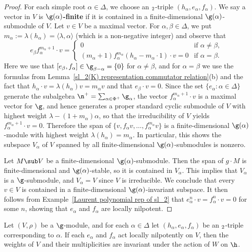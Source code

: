 \begin{proof}
For each simple root $\alpha\in\Delta$, we choose an $\sl_2$-triple $(h_\alpha,e_\alpha,f_\alpha)$. We say a vector in $V$ is \textbf{$\g(\alpha)$-finite} if it is contained in a finite-dimensional $\g(\alpha)$-submodule of $V$. Let $v\in V$ be a maximal vector. For $\alpha,\beta\in\Delta$, we put $m_\alpha:=\lambda(h_\alpha)=\langle\lambda,\alpha\rangle$ (which is a non-negative integer) and observe that
\[e_\beta f_\alpha^{m_\alpha+1}\cdot v=\begin{cases}
0&\text{if }\alpha\neq\beta,\\
(m_\alpha+1)f_\alpha^{m_\alpha}(h_\alpha-m_\alpha\cdot 1)\cdot v=0&\text{if }\alpha=\beta.
\end{cases}\]
Here we use that $[e_\beta,f_\alpha]\in\g_{\beta-\alpha}=\{0\}$ for $\alpha\neq\beta$, and for $\alpha=\beta$ we use the formulas from Lemma~\ref{sl_2(K) representation commutator relation}(b) and the fact that $h_\alpha\cdot v=\lambda(h_\alpha)v=m_\alpha v$ and that $e_\beta\cdot v=0$. Since the set $\{e_\alpha:\alpha\in\Delta\}$ generate the subalgebra $\n^+=\sum_{\alpha\in\Phi^+}\g_\alpha$, the vector $f_\alpha^{m_\alpha+1}\cdot v$ is a maximal vector for $\g$, and hence generates a proper standard cyclic submodule of $V$ with highest weight $\lambda-(1+m_\alpha)\alpha$, so that the irreducibility of $V$ yields $f_\alpha^{m_\alpha+1}\cdot v=0$. Therefore the span of $\{v,f_\alpha v,\dots,f_\alpha^{m_\alpha}v\}$ is a finite-dimensional $\g(\alpha)$-module with highest weight $\lambda(h_\alpha)=m_\alpha$. In particular, this shows the subspace $V_\alpha$ of $V$ spanned by all finite-dimensional $\g(\alpha)$-submodules is nonzero.\par
Let $M\sub V$ be a finite-dimensional $\g(\alpha)$-submodule. Then the span of $g\cdot M$ is finite-dimensional and $\g(\alpha)$-stable, so it is contained in $V_\alpha$. This implies that $V_\alpha$ is a $\g$-submodule, and $V_\alpha=V$ since $V$ is irreducible. We conclude that every $v\in V$ is contained in a finite-dimensional $\g(\alpha)$-invariant subspace. It then follows from Example~\ref{Laurent polynomial rep of sl_2} that $e_\alpha^n\cdot v=f_\alpha^n\cdot v=0$ for some $n$, showing that $e_\alpha$ and $f_\alpha$ are locally nilpotent.
\end{proof}
\begin{proposition}\label{Lie algebra rep locally nilpotent then unvariant}
Let $(V,\rho)$ be a $\g$-module, and for each $\alpha\in\Delta$ let $(h_\alpha,e_\alpha,f_\alpha)$ be an $\sl_2$-triple corresponding to $\alpha$. If each $e_\alpha$ and $f_\alpha$ act locally nilpotently on $V$, then the weights of $V$ and their multiplicities are invariant under the action of $W$ on $\h$.
\end{proposition}
